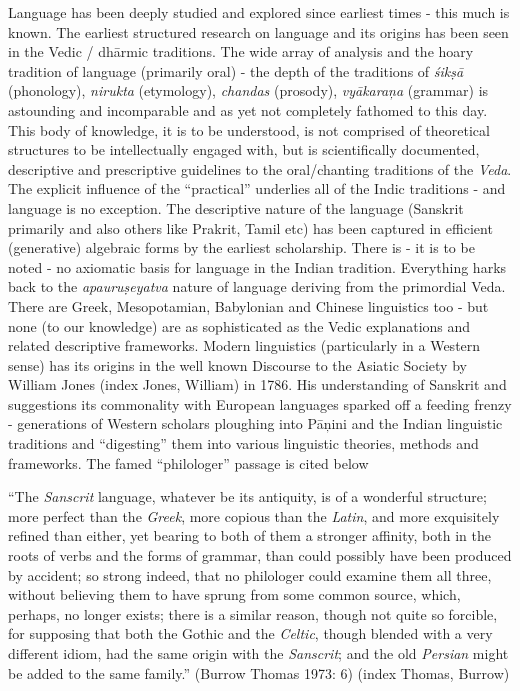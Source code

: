 Language has been deeply studied and explored since earliest times - this much is known. The earliest structured research on language and its origins has been seen in the Vedic / dhārmic traditions. The wide array of analysis and the hoary tradition of language (primarily oral) - the depth of the traditions of \textit{śikṣā} (phonology), \textit{nirukta} (etymology), \textit{chandas} (prosody), \textit{vyākaraņa} (grammar) is astounding and incomparable and as yet not completely fathomed to this day. This body of knowledge, it is to be understood, is not comprised of theoretical structures to be intellectually engaged with, but is scientifically documented, descriptive and prescriptive guidelines to the oral/chanting traditions of the \textit{Veda}. The explicit influence of the “practical” underlies all of the Indic traditions - and language is no exception. The descriptive nature of the language (Sanskrit primarily and also others like Prakrit, Tamil etc) has been captured in efficient (generative) algebraic forms by the earliest scholarship. There is - it is to be noted - no axiomatic basis for language in the Indian tradition. Everything harks back to the \textit{apauruṣeyatva} nature of language deriving from the primordial Veda. There are Greek, Mesopotamian, Babylonian and Chinese linguistics too - but none (to our knowledge) are as sophisticated as the Vedic explanations and related descriptive frameworks. Modern linguistics (particularly in a Western sense) has its origins in the well known Discourse to the Asiatic Society by William Jones (index Jones, William) in 1786. His understanding of Sanskrit and suggestions its commonality with European languages sparked off a feeding frenzy - generations of Western scholars ploughing into Pāņini and the Indian linguistic traditions and “digesting” them into various linguistic theories, methods and frameworks. The famed “philologer” passage is cited below

\vskip 4pt

\begin{myquote}
“The \textit{Sanscrit} language, whatever be its antiquity, is of a wonderful structure; more perfect than the \textit{Greek}, more copious than the \textit{Latin}, and more exquisitely refined than either, yet bearing to both of them a stronger affinity, both in the roots of verbs and the forms of grammar, than could possibly have been produced by accident; so strong indeed, that no philologer could examine them all three, without believing them to have sprung from some common source, which, perhaps, no longer exists; there is a similar reason, though not quite so forcible, for supposing that both the Gothic and the \textit{Celtic}, though blended with a very different idiom, had the same origin with the \textit{Sanscrit}; and the old \textit{Persian} might be added to the same family.” (Burrow Thomas 1973: 6) (index Thomas, Burrow)
\end{myquote}


